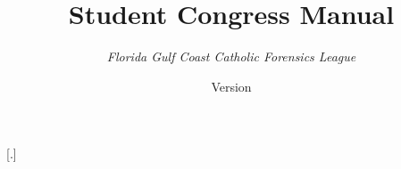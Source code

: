 


\title{\Huge \textbf{Student Congress Manual}}
\author{\LARGE \emph{Florida Gulf Coast Catholic Forensics League}\vspace{.125in}}
\date{\Large Version \vv}

\usepackage[hmargin=1in,vmargin=1in]{geometry}
\usepackage{libertine}

\usepackage{fancyhdr}
\pagestyle{fancy}
\renewcommand{\headrulewidth}{.5pt}
\renewcommand{\footrulewidth}{.5pt}
\lhead{}
\rhead{}
\cfoot{}
\rfoot{\small \thepage}

\usepackage{sectsty}
\sectionfont{\centering \huge \sffamily \bfseries}
\subsectionfont{\Large \sffamily \bfseries}
\subsubsectionfont{\normalsize \bfseries}
\paragraphfont{\mdseries \scshape}
\subparagraphfont{\itshape}

\usepackage{chngcntr}
\renewcommand{\thesection}{}
\renewcommand{\thesubsection}{\S\ \arabic{subsection}}
\renewcommand{\thesubsubsection}{(\alph{subsubsection})}

\usepackage{titlesec}
[.]

\usepackage[hang,flushmargin,multiple]{footmisc}

\usepackage{enumitem}

\usepackage{nicefrac}

\usepackage{verbatim}


\usepackage{hyperref}
